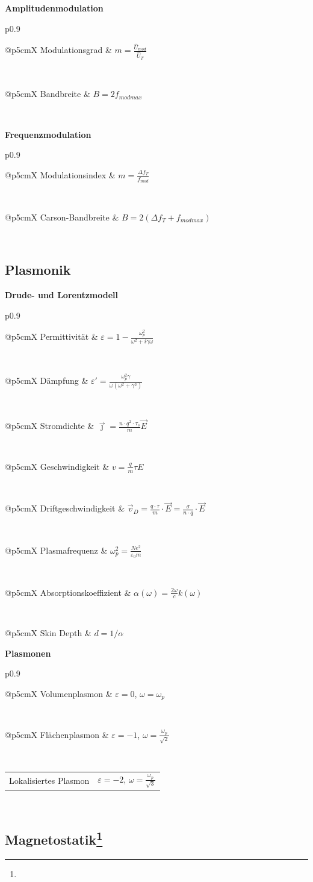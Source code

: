\documentclass[12pt,a4paper, twoside]{article}
\makeatletter
\renewcommand{\=}[1]{\stackrel{#1}{=}}
\newcommand{\js}{\vec \jmath}
\newcommand{\eps}{\varepsilon}
\theoremstyle{definition}
\theoremstyle{remark}
\newcommand{\concept}[2]{%
\noindent
\begin{framed}
\noindent\textbf{#1}
\par\begin{tabular}{p{0.9\linewidth}}
#2
\end{tabular}
\end{framed}
}
\newcommand{\f}[2]{%
\noindent\begin{tabularx}{\linewidth}{@{}p{5cm}X}
#1 & $#2$
\end{tabularx}}
\makeatother
\begin{document}
\concept{Amplitudenmodulation}{
\f{Modulationsgrad}{m = \frac{\hat U_{mod}}{\hat U_T}}\\
\f{Bandbreite}{B = 2 f_{mod max}}\\

}

\concept{Frequenzmodulation}{
\f{Modulationsindex}{m = \frac{\Delta f_T}{f_{mod}}}\\
\f{Carson-Bandbreite}{B = 2 (\Delta f_T + f_{mod max})}\\

}

\subsection{Plasmonik}

\concept{Drude- und Lorentzmodell}{
\f{Permittivität}{\varepsilon = 1 - \frac{\omega_p^2}{\omega^2 + i \gamma \omega}}\\
\f{Dämpfung}{\eps' = \frac{\omega_p^2 \gamma}{\omega(\omega^2 + \gamma^2)}}\\
\f{Stromdichte}{\js =\frac{n \cdot q^2 \cdot \tau_s}{m} \vec{E}}\\
\f{Geschwindigkeit}{v = \frac{q}{m} \tau E}\\
\f{Driftgeschwindigkeit}{\vec{v}_D = \frac{q \cdot \tau}{m} \cdot \vec{E} = \frac{\sigma}{n \cdot q} \cdot \vec{E}}\\
\f{Plasmafrequenz}{\omega_p^2 = \frac{N e^2}{\varepsilon_0 m}}\\
\f{Absorptionskoeffizient}{\alpha(\omega) = \frac{2\omega}{c}k(\omega)}\\
\f{Skin Depth}{d = 1/\alpha}
}

\concept{Plasmonen}{
\f{Volumenplasmon}{\eps = 0$, $\omega = \omega_p}\\
\f{Flächenplasmon}{\eps = -1$, $\omega = \frac{\omega_p}{\sqrt{2}}}\\
\f{Lokalisiertes Plasmon}{\eps = -2$, $\omega = \frac{\omega_p}{\sqrt{3}}}\\
}


\subsection[Magnetostatik]{Magnetostatik\let\thefootnote\relax\footnote{}}
\end{document}
